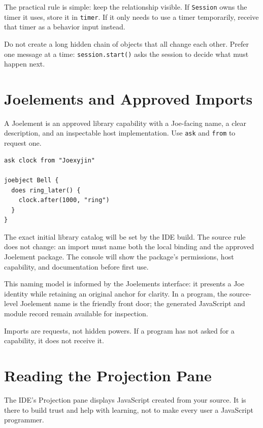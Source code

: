\documentclass[12pt]{article}
\newcommand{\kw}[1]{\texttt{#1}}
\begin{document}
The practical rule is simple: keep the relationship visible. If \kw{Session} owns the timer it uses, store it in \kw{timer}. If it only needs to use a timer temporarily, receive that timer as a behavior input instead.

\begin{warnbox}
Do not create a long hidden chain of objects that all change each other. Prefer one message at a time: \kw{session.start()} asks the session to decide what must happen next.
\end{warnbox}

\clearpage
\section{Joelements and Approved Imports}
A Joelement is an approved library capability with a Joe-facing name, a clear description, and an inspectable host implementation. Use \kw{ask} and \kw{from} to request one.

\begin{lstlisting}[style=joe]
ask clock from "Joexyjin"

joebject Bell {
  does ring_later() {
    clock.after(1000, "ring")
  }
}
\end{lstlisting}

The exact initial library catalog will be set by the IDE build. The source rule does not change: an import must name both the local binding and the approved Joelement package. The console will show the package's permissions, host capability, and documentation before first use.

This naming model is informed by the Joelements interface: it presents a Joe identity while retaining an original anchor for clarity.\cite{joelements} In a program, the source-level Joelement name is the friendly front door; the generated JavaScript and module record remain available for inspection.

\begin{rulebox}
Imports are requests, not hidden powers. If a program has not asked for a capability, it does not receive it.
\end{rulebox}

\clearpage
\section{Reading the Projection Pane}
The IDE's Projection pane displays JavaScript created from your source. It is there to build trust and help with learning, not to make every user a JavaScript programmer.
\end{document}
